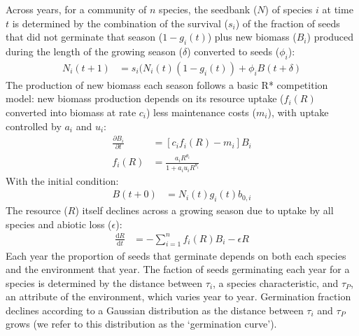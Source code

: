 \documentclass[11pt,letterpaper]{article}
\begin{document}
Across years, for a community of \(n\) species, the seedbank ($N$) of species $i$ at time $t$ is determined by the combination of the survival ($s_i$) of the fraction of seeds that did not germinate that season ($1-g_{i}(t)$) plus new biomass ($B_i$) produced during the length of the  growing season ($\delta$) converted to seeds ($\phi_i$):
\begin{align}
N_{i}(t+1) & =
s_{i}(N_{i}(t)(1-g_{i}(t))+\phi_{i}B(t+\delta)
\end{align}
The production of new biomass each season follows a basic R* competition model: new biomass production depends on its resource uptake ($f_i(R)$ converted into biomass at rate $c_i$) less maintenance costs ($m_i$), with uptake controlled by $a_i$ and $u_i$:
\begin{align}
\frac{\partial B_{i}}{\partial t} &  = [c_{i}f_{i}(R) - m_{i}]B_{i} \\
f_{i}(R) & = \frac{a_{i}R^{\theta_{i}}}{1+a_{i}u_{i}R^{\theta_{i}}}
\end{align}
With the initial condition:
\begin{align}
B(t+0) & = N_{i}(t)g_{i}(t)b_{0,i}
\end{align}
The resource ($R$) itself declines across a growing season due to uptake by all species and abiotic loss ($\epsilon$):
\begin{align}
\frac{\mathrm{d}R}{\mathrm{d}t} & = - \sum_{i=1}^{n}f_{i}(R)B_{i} -\epsilon R
\end{align}
Each year the proportion of seeds that germinate depends on both each species and the environment that year. The faction of seeds germinating each year for a species is determined by the distance between $\tau_i$, a species characteristic, and $\tau_P$, an attribute of the environment, which varies year to year. Germination fraction declines according to a Gaussian distribution as the distance between $\tau_i$ and $\tau_P$ grows (we refer to this distribution as the `germination curve').
\end{document}
